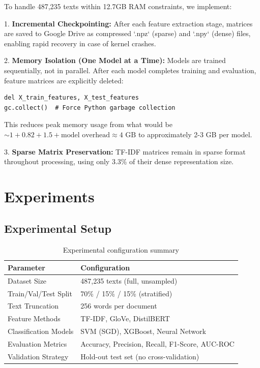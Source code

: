\documentclass[12pt, a4paper]{article}
\begin{document}
To handle 487,235 texts within 12.7GB RAM constraints, we implement:

1. \textbf{Incremental Checkpointing:} After each feature extraction stage, matrices are saved to Google Drive as compressed `.npz` (sparse) and `.npy` (dense) files, enabling rapid recovery in case of kernel crashes.

2. \textbf{Memory Isolation (One Model at a Time):} Models are trained sequentially, not in parallel. After each model completes training and evaluation, feature matrices are explicitly deleted:
\begin{lstlisting}
del X_train_features, X_test_features
gc.collect()  # Force Python garbage collection
\end{lstlisting}
This reduces peak memory usage from what would be $\sim 1 + 0.82 + 1.5 + \text{model overhead} \approx 4 \text{ GB}$ to approximately 2-3 GB per model.

3. \textbf{Sparse Matrix Preservation:} TF-IDF matrices remain in sparse format throughout processing, using only 3.3\% of their dense representation size.

\section{Experiments}

\subsection{Experimental Setup}

\begin{table}[H]
\centering
\caption{Experimental configuration summary}
\begin{tabular}{lp{8cm}}
\toprule
\textbf{Parameter} & \textbf{Configuration} \\
\midrule
Dataset Size & 487,235 texts (full, unsampled) \\
Train/Val/Test Split & 70\% / 15\% / 15\% (stratified) \\
Text Truncation & 256 words per document \\
Feature Methods & TF-IDF, GloVe, DistilBERT \\
Classification Models & SVM (SGD), XGBoost, Neural Network \\
Evaluation Metrics & Accuracy, Precision, Recall, F1-Score, AUC-ROC \\
Validation Strategy & Hold-out test set (no cross-validation) \\
\bottomrule
\end{tabular}
\end{table}
\end{document}
